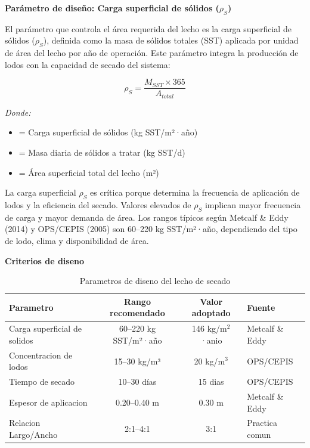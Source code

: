 \documentclass[12pt,a4paper]{article}
\begin{document}
\textbf{Parámetro de diseño: Carga superficial de sólidos ($\rho_S$)}

El parámetro que controla el área requerida del lecho es la carga superficial de sólidos ($\rho_S$), definida como la masa de sólidos totales (SST) aplicada por unidad de área del lecho por año de operación. Este parámetro integra la producción de lodos con la capacidad de secado del sistema:

\begin{equation}
\rho_S = \frac{M_{SST} \times 365}{A_{total}}
\end{equation}

\textit{Donde:}
\begin{itemize}[noitemsep,leftmargin=2em]
    \item[$\rho_S$] = Carga superficial de sólidos (kg SST/m²·año)
    \item[$M_{SST}$] = Masa diaria de sólidos a tratar (kg SST/d)
    \item[$A_{total}$] = Área superficial total del lecho (m²)
\end{itemize}

La carga superficial $\rho_S$ es crítica porque determina la frecuencia de aplicación de lodos y la eficiencia del secado. Valores elevados de $\rho_S$ implican mayor frecuencia de carga y mayor demanda de área. Los rangos típicos según Metcalf \& Eddy (2014) y OPS/CEPIS (2005) son 60--220 kg SST/m²·año, dependiendo del tipo de lodo, clima y disponibilidad de área.

\textbf{Criterios de diseno}

\begin{table}[H]
\centering
\caption{Parametros de diseno del lecho de secado}
\small
\begin{tabular}{lccl}
\toprule
Parametro & Rango recomendado & Valor adoptado & Fuente \\
\midrule
Carga superficial de solidos & 60--220 kg SST/m²·año & 146 kg/m$^2$·anio & Metcalf \& Eddy \cite{metcalf2014} \\
Concentracion de lodos & 15--30 kg/m³ & 20 kg/m$^3$ & OPS/CEPIS \cite{ops2005} \\
Tiempo de secado & 10--30 días & 15 dias & OPS/CEPIS \\
Espesor de aplicacion & 0.20--0.40 m & 0.30 m & Metcalf \& Eddy \\
Relacion Largo/Ancho & 2:1--4:1 & 3:1 & Practica comun \\
\bottomrule
\end{tabular}
\end{table}
\end{document}
